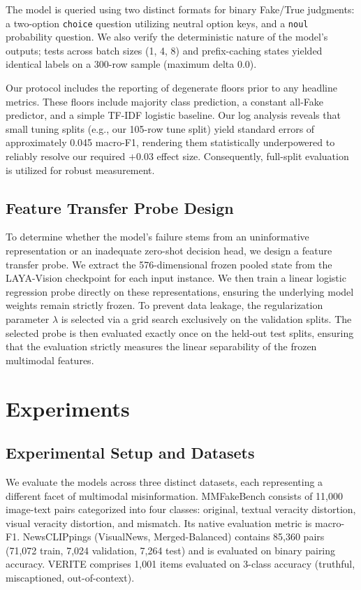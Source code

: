\documentclass{article} %
\begin{document}
The model is queried using two distinct formats for binary Fake/True judgments: a two-option \texttt{choice} question utilizing neutral option keys, and a \texttt{noul} probability question. We also verify the deterministic nature of the model's outputs; tests across batch sizes (1, 4, 8) and prefix-caching states yielded identical labels on a 300-row sample (maximum delta 0.0).

Our protocol includes the reporting of degenerate floors prior to any headline metrics. These floors include majority class prediction, a constant all-Fake predictor, and a simple TF-IDF logistic baseline. Our log analysis reveals that small tuning splits (e.g., our 105-row tune split) yield standard errors of approximately 0.045 macro-F1, rendering them statistically underpowered to reliably resolve our required $+0.03$ effect size. Consequently, full-split evaluation is utilized for robust measurement.

\subsection{Feature Transfer Probe Design}
To determine whether the model's failure stems from an uninformative representation or an inadequate zero-shot decision head, we design a feature transfer probe. We extract the 576-dimensional frozen pooled state from the LAYA-Vision checkpoint for each input instance. We then train a linear logistic regression probe \citep{Pedregosa2011ScikitlearnMachine} directly on these representations, ensuring the underlying model weights remain strictly frozen. To prevent data leakage, the regularization parameter $\lambda$ is selected via a grid search exclusively on the validation splits. The selected probe is then evaluated exactly once on the held-out test splits, ensuring that the evaluation strictly measures the linear separability of the frozen multimodal features.

\section{Experiments}
\label{sec:experiments}
\subsection{Experimental Setup and Datasets}
We evaluate the models across three distinct datasets, each representing a different facet of multimodal misinformation. MMFakeBench consists of 11,000 image-text pairs categorized into four classes: original, textual veracity distortion, visual veracity distortion, and mismatch. Its native evaluation metric is macro-F1. NewsCLIPpings (VisualNews, Merged-Balanced) contains 85,360 pairs (71,072 train, 7,024 validation, 7,264 test) and is evaluated on binary pairing accuracy. VERITE comprises 1,001 items evaluated on 3-class accuracy (truthful, miscaptioned, out-of-context). 
\end{document}
